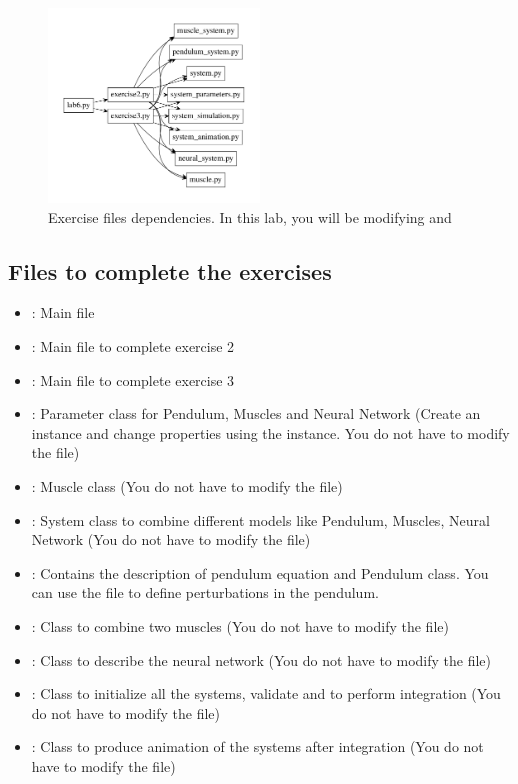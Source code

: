 \documentclass{cmc}
\begin{document}
\begin{figure}[ht]
  \centering \includegraphics[width=0.5\textwidth]{figures/files}
  \caption{\label{fig:files} Exercise files dependencies. In this lab,
    you will be modifying  and
    }
\end{figure}

\subsection*{Files to complete the exercises}
\label{sec:intro}

\begin{itemize}
\item {} : Main file
\item {} : Main file to complete exercise 2
\item {} : Main file to complete exercise 3
\item {} : Parameter class for Pendulum,
  Muscles and Neural Network (Create an instance and change properties
  using the instance. You do not have to modify the file)
\item {} : Muscle class (You do not have to modify
  the file)
\item {} : System class to combine different models %
  like Pendulum, Muscles, Neural Network (You do not have to modify
  the file)
\item {} : Contains the description of
  pendulum equation and Pendulum class. You can use the file to define
  perturbations in the pendulum.
\item {} : Class to combine two muscles (You
  do not have to modify the file)
\item {} : Class to describe the neural
  network (You do not have to modify the file)
\item {} : Class to initialize all the
  systems, validate and to perform integration (You do not have to
  modify the file)
\item {} : Class to produce animation of
  the systems after integration (You do not have to modify the file)
\end{itemize}
\end{document}
